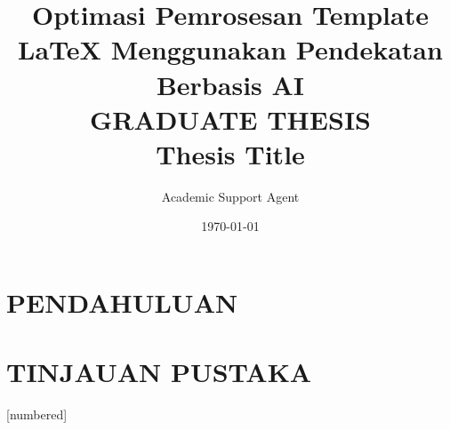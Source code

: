 \documentclass{beamer}
\title{Optimasi Pemrosesan Template LaTeX Menggunakan Pendekatan Berbasis AI}
\author{Academic Support Agent}
\date{\today}
\begin{document}
\maketitle

\begin{abstract}

\end{abstract}

\chapter{PENDAHULUAN}


\chapter{TINJAUAN PUSTAKA}



[numbered]

\usepackage[utf8]{inputenc}
\usepackage[T1]{fontenc}    %
\usepackage{url}            %
\usepackage{booktabs}       %
\usepackage{amsfonts}       %
\usepackage{nicefrac}       %
\usepackage{microtype}      %
\usepackage{mathtools}
\usepackage{multicol}
\usepackage{comment}
\usepackage{forest}
\usepackage[linesnumbered, ruled]{algorithm2e}
\usepackage{algorithmic}
\usepackage{xcolor}
\usepackage{colortbl}
\usepackage{graphicx}
\usepackage{diagbox}
\usepackage{tikz}
\usepackage{subcaption}
\usepackage{amsmath}
\usepackage{dsfont}
\usepackage{stmaryrd}
\usepackage[style=authortitle,backend=bibtex]{biblatex}


\renewcommand{\footnotesize}{\tiny}
\newcommand{\mathbi}[1]{\boldsymbol{#1}}
\newtheorem{proposition}{Proposition}

\title[Short Title] %
{\vspace*{1cm}\\\textbf{GRADUATE THESIS}\\\textbf{Thesis Title}}
\end{document}
